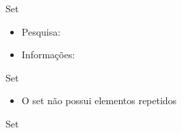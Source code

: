\begin{frame}[fragile]{Set}

    \begin{itemize}
        \item Pesquisa:
        \item Informações:
    \end{itemize}

\end{frame}

\begin{frame}[fragile]{Set}

    \begin{itemize}
        \item O set não possui elementos repetidos
    \end{itemize}

\end{frame}

\begin{frame}[fragile]{Set}


\end{frame}
